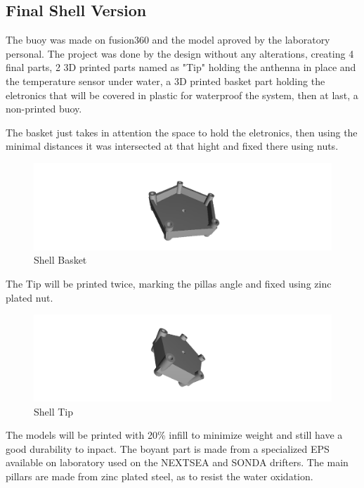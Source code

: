 \subsection{Final Shell Version}

The buoy was made on fusion360 and the model aproved by the laboratory personal. The project was done by the
design without any alterations, creating 4 final parts, 2 3D printed parts named as "Tip" holding the anthenna
in place and the temperature sensor under water, a 3D printed basket part holding the eletronics that will be
covered in plastic for waterproof the system, then at last, a non-printed buoy. 

The basket just takes in attention the space to hold the eletronics, then using the minimal distances it was
intersected at that hight and fixed there using nuts.
\begin{figure}[H]
    \centering
    \includegraphics[width=1\textwidth]{images/chapter/implementation/Cesto.png}  %
    \caption{Shell Basket}
    \label{fig:Shell Basket}        
\end{figure}

The Tip will be printed twice, marking the pillas angle and fixed using zinc plated nut.
\begin{figure}[H]
    \centering
    \includegraphics[width=1\textwidth]{images/chapter/implementation/ponta.png}  %
    \caption{Shell Tip}
    \label{fig:Shell Tip}        
\end{figure}

The models will be printed with 20\% infill to minimize weight and still have a good durability to inpact.
The boyant part is made from a specialized EPS available on laboratory used on the NEXTSEA and SONDA drifters.
The main pillars are made from zinc plated steel, as to resist the water oxidation.

